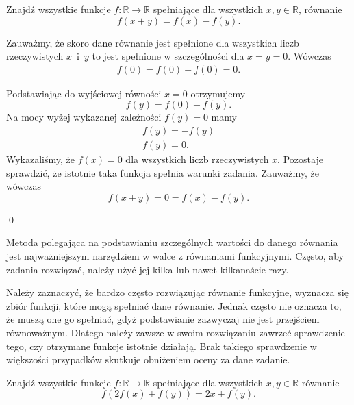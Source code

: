 


\noindent
Znajdź wszystkie funkcje $f:\mathbb{R}\rightarrow\mathbb{R}$ spełniające dla wszystkich $x, y \in \mathbb{R}$, równanie 
\[
    f(x + y) = f(x) − f(y).
\]


\noindent
Zauważmy, że skoro dane równanie jest spełnione dla wszystkich liczb rzeczywistych $x$~i~$y$ to jest spełnione w szczególności dla $x = y = 0$. Wówczas
\begin{gather*}
    f(0) = f(0) - f(0) = 0.
\end{gather*}

\noindent
Podstawiając do wyjściowej równości $x = 0$ otrzymujemy
\[
    f(y) = f(0) - f(y).
\]
Na mocy wyżej wykazanej zależności $f(y) = 0$ mamy
\begin{gather*}
    f(y) = - f(y) \\
    f(y) = 0.
\end{gather*}
Wykazaliśmy, że $f(x) = 0$ dla wszystkich liczb rzeczywistych $x$. Pozostaje sprawdzić, że istotnie taka funkcja spełnia warunki zadania. Zauważmy, że wówczas
\[
    f(x + y) = 0 = f(x) - f(y).
\]

\qed

\vspace{10px}

\noindent
Metoda polegająca na podstawianiu szczególnych wartości do danego równania jest najważniejszym narzędziem w walce z równaniami funkcyjnymi. Często, aby zadania rozwiązać, należy użyć jej kilka lub nawet kilkanaście razy.

\vspace{10px}

\noindent
Należy zaznaczyć, że bardzo często rozwiązując równanie funkcyjne, wyznacza się zbiór funkcji, które mogą spełniać dane równanie. Jednak często nie oznacza to, że muszą one go spełniać, gdyż podstawianie zazwyczaj nie jest przejściem równoważnym. Dlatego należy zawsze w swoim rozwiązaniu zawrzeć sprawdzenie tego, czy otrzymane funkcje istotnie działają. Brak takiego sprawdzenie w większości przypadków skutkuje obniżeniem oceny za dane zadanie.

\vspace{20px}


\noindent
Znajdź wszystkie funkcje $f:\mathbb{R}\rightarrow\mathbb{R}$ spełniające dla wszystkich $x, y \in \mathbb{R}$ równanie 
\[
    f(2f(x) + f(y)) = 2x + f(y).
\]

